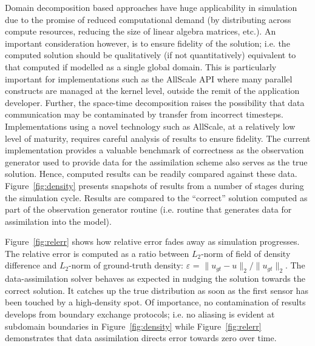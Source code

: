 \documentclass[conference,compsoc]{IEEEtran}
\begin{document}
Domain decomposition based approaches have huge applicability in simulation due to the promise of reduced computational demand (by distributing across compute resources, reducing the size of linear algebra matrices, etc.). An important consideration however, is to ensure fidelity of the solution; i.e. the computed solution should be qualitatively (if not quantitatively) equivalent to that computed if modelled as a single global domain. This is particularly important for implementations such as the AllScale API where many parallel constructs are managed at the kernel level, outside the remit of the application developer. Further, the space-time decomposition raises the possibility that data communication may be contaminated by transfer from incorrect timesteps. Implementations using a novel technology such as AllScale, at a relatively low level of maturity, requires careful analysis of results to ensure fidelity. The current implementation provides a valuable benchmark of correctness as the observation generator used to provide data for the assimilation scheme also serves as the true solution. Hence, computed results can be readily compared against these data. Figure~\ref{fig:density} presents snapshots of results from a number of stages during the simulation cycle. Results are compared to the ``correct'' solution computed as part of the observation generator routine (i.e. routine that generates data for assimilation into the model).



Figure~\ref{fig:relerr} shows how relative error fades away as simulation progresses. The relative error is computed as a ratio between $L_2$-norm of field of density difference and  $L_2$-norm of ground-truth density: $\varepsilon$ = $\|u_{gt} - u\|_2/\|u_{gt}\|_2$. The data-assimilation solver behaves as expected in nudging the solution towards the correct solution. It catches up the true distribution as soon as the first sensor has been touched by a high-density spot. Of importance, no contamination of results develops from boundary exchange protocols; i.e.  no aliasing is evident at subdomain boundaries in Figure~\ref{fig:density} while Figure~\ref{fig:relerr} demonstrates that data assimilation directs error towards zero over time. 
\end{document}
